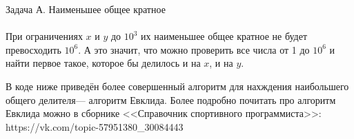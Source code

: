 {\large Задача А. Наименьшее общее кратное}
\\
\\
При ограничениях $x$ и $y$ до $10^3$ их наименьшее общее кратное не будет превосходить $10^6$. А это значит, что можно проверить все числа от 1 до $10^6$ и найти первое такое, которое бы делилось и на $x$, и на $y$.

В коде ниже приведён более совершенный алгоритм для нахждения наибольшего общего делителя--- алгоритм Евклида. Более подробно почитать про алгоритм Евклида можно в сборнике <<Справочник спортивного программиста>>: https://vk.com/topic-57951380_30084443
